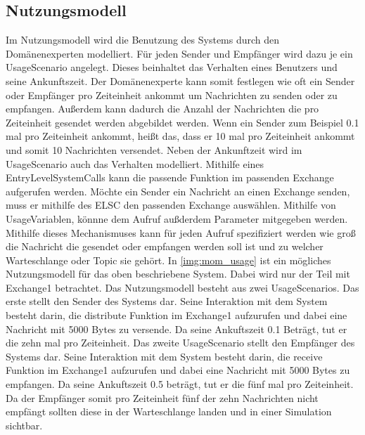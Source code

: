 \subsection{Nutzungsmodell}
Im Nutzungsmodell wird die Benutzung des Systems durch den Domänenexperten modelliert. Für jeden Sender und Empfänger wird dazu je ein UsageScenario angelegt. Dieses beinhaltet das Verhalten eines Benutzers und seine Ankunftszeit. Der Domänenexperte kann somit festlegen wie oft ein Sender oder Empfänger pro Zeiteinheit ankommt um Nachrichten zu senden oder zu empfangen. Außerdem kann dadurch die Anzahl der Nachrichten die pro Zeiteinheit gesendet werden abgebildet werden. Wenn ein Sender zum Beispiel 0.1 mal pro Zeiteinheit ankommt, heißt das, dass er 10 mal pro Zeiteinheit ankommt und somit 10 Nachrichten versendet. Neben der Ankunftzeit wird im UsageScenario auch das Verhalten modelliert. Mithilfe eines EntryLevelSystemCalls kann die passende Funktion im passenden Exchange aufgerufen werden. Möchte ein Sender ein Nachricht an einen Exchange senden, muss er mithilfe des ELSC den passenden Exchange auswählen. Mithilfe von UsageVariablen, könnne dem Aufruf außderdem Parameter mitgegeben werden. Mithilfe dieses Mechanismuses kann für jeden Aufruf spezifiziert werden wie groß die Nachricht die gesendet oder empfangen werden soll ist und zu welcher Warteschlange oder Topic sie gehört. In \autoref{img:mom_usage} ist ein mögliches Nutzungsmodell für das oben beschriebene System. Dabei wird nur der Teil mit Exchange1 betrachtet. Das Nutzungsmodell besteht aus zwei UsageScenarios. Das erste stellt den Sender des Systems dar. Seine Interaktion mit dem System besteht darin, die distribute Funktion im Exchange1 aufzurufen und dabei eine Nachricht mit 5000 Bytes zu versende. Da seine Ankuftszeit 0.1 Beträgt, tut er die zehn mal pro Zeiteinheit. Das zweite UsageScenario stellt den Empfänger des Systems dar. Seine Interaktion mit dem System besteht darin, die receive Funktion im Exchange1 aufzurufen und dabei eine Nachricht mit 5000 Bytes zu empfangen. Da seine Ankuftszeit 0.5 beträgt, tut er die fünf mal pro Zeiteinheit. Da der Empfänger somit pro Zeiteinheit fünf der zehn Nachrichten nicht empfängt sollten diese in der Warteschlange landen und in einer Simulation sichtbar.

